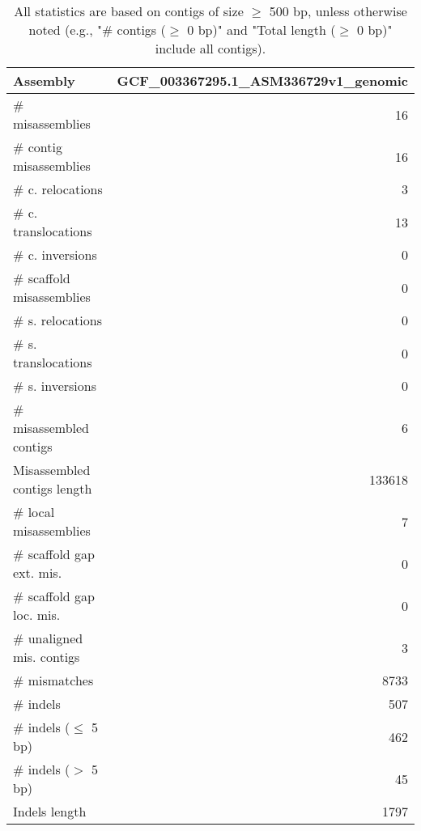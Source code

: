\documentclass[12pt,a4paper]{article}
\begin{document}
\begin{table}[ht]
\begin{center}
\caption{All statistics are based on contigs of size $\geq$ 500 bp, unless otherwise noted (e.g., "\# contigs ($\geq$ 0 bp)" and "Total length ($\geq$ 0 bp)" include all contigs).}
\begin{tabular}{|l*{1}{|r}|}
\hline
Assembly & GCF\_003367295.1\_ASM336729v1\_genomic \\ \hline
\# misassemblies & 16 \\ \hline
\hspace{2mm}\# contig misassemblies & 16 \\ \hline
\hspace{5mm}\# c. relocations & 3 \\ \hline
\hspace{5mm}\# c. translocations & 13 \\ \hline
\hspace{5mm}\# c. inversions & 0 \\ \hline
\hspace{2mm}\# scaffold misassemblies & 0 \\ \hline
\hspace{5mm}\# s. relocations & 0 \\ \hline
\hspace{5mm}\# s. translocations & 0 \\ \hline
\hspace{5mm}\# s. inversions & 0 \\ \hline
\# misassembled contigs & 6 \\ \hline
Misassembled contigs length & 133618 \\ \hline
\# local misassemblies & 7 \\ \hline
\# scaffold gap ext. mis. & 0 \\ \hline
\# scaffold gap loc. mis. & 0 \\ \hline
\# unaligned mis. contigs & 3 \\ \hline
\# mismatches & 8733 \\ \hline
\# indels & 507 \\ \hline
\hspace{5mm}\# indels ($\leq$ 5 bp) & 462 \\ \hline
\hspace{5mm}\# indels ($>$ 5 bp) & 45 \\ \hline
Indels length & 1797 \\ \hline
\end{tabular}
\end{center}
\end{table}
\end{document}
